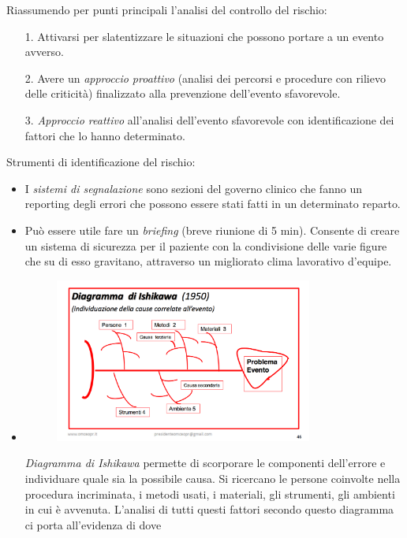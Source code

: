 Riassumendo per punti principali l'analisi del controllo del rischio:

\begin{itemize}
\item[1.]
  Attivarsi per slatentizzare le situazioni che possono portare a un
  evento avverso.
\item[2.]
  Avere un \emph{approccio proattivo} (analisi dei percorsi e procedure
  con rilievo delle criticità) finalizzato alla prevenzione dell'evento
  sfavorevole.
\item[3.]
  \emph{Approccio reattivo} all'analisi dell'evento sfavorevole con
  identificazione dei fattori che lo hanno determinato.
\end{itemize}
Strumenti di identificazione del rischio:

\begin{itemize}
\item
  I \emph{sistemi di segnalazione} sono sezioni del governo clinico che
  fanno un reporting degli errori che possono essere stati fatti in un
  determinato reparto.
\item
  Può essere utile fare un \emph{briefing} (breve riunione di 5 min).
  Consente di creare un sistema di sicurezza per il paziente con la
  condivisione delle varie figure che su di esso gravitano, attraverso
  un migliorato clima lavorativo d'equipe.
\item
  \begin{figure}[!ht]
\centering
	\includegraphics[width=0.8\textwidth]{30/image4.png}
	\end{figure}	
	\emph{Diagramma
  di Ishikawa} permette di scorporare le componenti dell'errore e
  individuare quale sia la possibile causa. Si ricercano le persone
  coinvolte nella procedura incriminata, i metodi usati, i materiali,
  gli strumenti, gli ambienti in cui è avvenuta. L'analisi di tutti
  questi fattori secondo questo diagramma ci porta all'evidenza di dove

\end{itemize}
